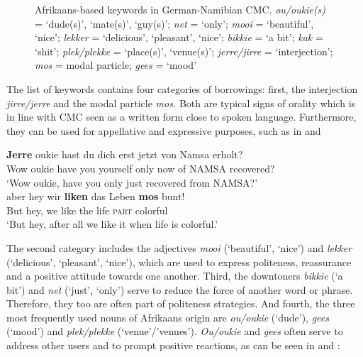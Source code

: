 \documentclass[output=paper]{langsci/langscibook}
\begin{document}
  \begin{figure}
\caption{Afrikaans-based keywords in German-Namibian CMC. \textit{ou/oukie(s)} = ‘dude(s)’, ‘mate(s)’, ‘guy(s)’; \textit{net} = ‘only’; \textit{mooi} = ‘beautiful’, ‘nice’; \textit{lekker} = ‘delicious’, ‘pleasant’, ‘nice’; \textit{bikkie} = ‘a bit’; \textit{kak} = ‘shit’; \textit{plek/plekke} = ‘place(s)’, ‘venue(s)’; \textit{jerre/jirre} = ‘interjection’; \textit{mos} = modal particle; \textit{gees} = ‘mood’}
\label{fig:radke:3}
\end{figure}  

The list of keywords contains four categories of borrowings: first, the interjection \textit{jirre/jerre} and the modal particle \textit{mos.} Both are typical signs of orality which is in line with CMC seen as a written form close to  spoken language. Furthermore, they can be used for appellative and expressive purposes, such as in  and 

\ea
\label{ex:radke:5}
\gll \textbf{Jerre} oukie hast du dich erst jetzt von Namsa erholt? \\
	Wow oukie have you yourself only now of NAMSA recovered?\\
	\glt `Wow oukie, have you only just recovered from NAMSA?'\\
\ex
\label{ex:radke:6}
\gll aber hey wir \textbf{liken} das Leben \textbf{mos} bunt!\\
   But hey, we like the life \textsc{part}  colorful\\
\glt  `But hey, after all we like it when life is colorful.'\\
\z

The second category includes the adjectives \textit{mooi} (‘beautiful’, ‘nice’) and \textit{lekker} (‘delicious’, ‘pleasant’, ‘nice’), which are used to express politeness, reassurance and a positive attitude towards one another. Third, the downtoners \textit{bikkie} (‘a bit’) and \textit{net} (‘just’, ‘only’) serve to reduce the force of another word or phrase. Therefore, they too are often part of politeness strategies. And fourth, the three most frequently used nouns of Afrikaans origin are \textit{ou/oukie} (‘dude’), \textit{gees} (‘mood’) and \textit{plek/plekke} (‘venue’/’venues’). \textit{Ou/oukie} and \textit{gees} often serve to address other users and to prompt positive reactions, as can be seen in  and :
\end{document}
